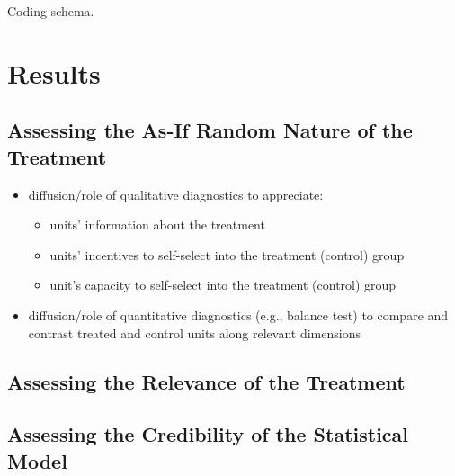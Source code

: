 \documentclass[nobib]{tufte-handout}
\begin{document}
\begin{refsection}


\begin{table}
    \large
    \sffamily
    \begin{small}
        \caption{}
        \label{tab:coding_schema}
        \begin{center}
            
        \end{center}
    \end{small}
    \caption{Coding schema.}
\end{table}

\section{Results}
\label{sec:resuts}

\subsection{Assessing the As-If Random Nature of the Treatment}
\label{sub:random_nature}



\begin{itemize}
    \item diffusion/role of qualitative diagnostics to appreciate:
        \begin{itemize}
            \item units' information about the treatment
            \item units' incentives to self-select into the treatment (control)
                group
            \item unit's capacity to self-select into the treatment (control)
                group
        \end{itemize}
    \item diffusion/role of quantitative diagnostics (e.g., balance test) to 
        compare and contrast treated and control units along relevant dimensions
\end{itemize}

\subsection{Assessing the Relevance of the Treatment}
\label{sub:relevance}



\subsection{Assessing the Credibility of the Statistical Model}
\label{sub:credibility}


\end{refsection}
\end{document}
